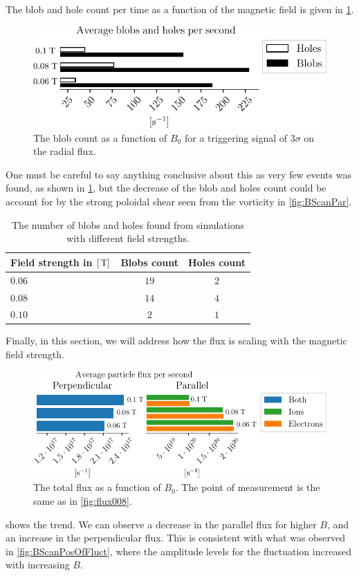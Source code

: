 The blob and hole count per time as a function of the magnetic field is given in \cref{fig:BScanBlobCount}.
%
\begin{figure}[htb]
    \centering
    \includegraphics{fig/results/bScan/BScanBlobCount}
    \caption{The blob count as a function of $B_0$ for a triggering signal of $3\sigma$ on the radial flux.}
    \label{fig:BScanBlobCount}
\end{figure}
%
One must be careful to say anything conclusive about this as very few events was found, as shown in \cref{tb:blobAndHolesCount}, but the decrease of the blob and holes count could be account for by the strong poloidal shear seen from the vorticity in \cref{fig:BScanPar}.
%
\begin{table}[h!]
\begin{center}
        \begin{tabular}{l|cc}
            \hline
            Field strength in $[\, \text{T}]$ & Blobs count & Holes count\\
            \hline
            $0.06$ & $19$ & $2$ \\
            $0.08$ & $14$ & $4$ \\
            $0.10$ & $ 2$ & $1$ \\
            \hline\hline
        \end{tabular}
        \caption{The number of blobs and holes found from simulations with different field strengths.}
        \label{tb:blobAndHolesCount}
\end{center}
\end{table}
%

Finally, in this section, we will address how the flux is scaling with the magnetic field strength.
%
\begin{figure}[htb]
    \centering
    \includegraphics{fig/results/bScan/BScanTotalFlux}
    \caption{
        The total flux as a function of $B_0$.
        The point of measurement is the same as in \cref{fig:flux008}.
    }
    \label{fig:BScanTotalFlux}
\end{figure}
%
 shows the trend.
We can observe a decrease in the parallel flux for higher $B$, and an increase in the perpendicular flux.
This is consistent with what was observed in \cref{fig:BScanPosOfFluct}, where the amplitude levels for the fluctuation increased with increasing $B$.
